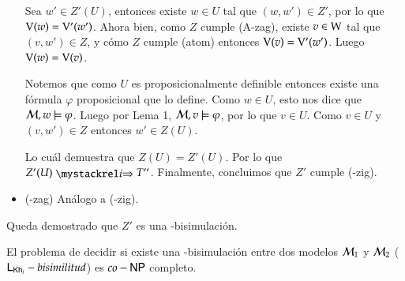 \begin{demostracion}
\begin{itemize}
        Sea $w' \in Z'(U)$, entonces existe $w \in U$ tal que $(w,w') \in Z'$, por lo que $\mathrm{V}(w) = \mathrm{V}'(w')$. Ahora bien, como $Z$ cumple (A-zag), existe $v \in \mathrm{W}$ tal que $(v,w') \in Z$, y cómo $Z$ cumple (atom) entonces $\mathrm{V}(v) = \mathrm{V}'(w')$. Luego $\mathrm{V}(w) = \mathrm{V}(v)$.
    
        Notemos que como $U$ es proposicionalmente definible entonces existe una fórmula $\varphi$ proposicional que lo define. Como $w \in U$, esto nos dice que $\mathcal{M}, w \models \varphi$. Luego por Lema 1, $\mathcal{M}, v \models \varphi$, por lo que $v \in U$. Como $v \in U$ y $(v,w') \in Z$ entonces $w' \in Z(U)$.
    
        Lo cuál demuestra que $Z(U) = Z'(U)$. Por lo que $Z'(U) \ultsExecAgi T''$. Finalmente, concluimos que $Z'$ cumple (\KHilogic-zig).
    
    
        \item (\KHilogic-zag) Análogo a (\KHilogic-zig).
    \end{itemize}
    
    Queda demostrado que $Z'$ es una \KHilogic-bisimulación.
\end{demostracion}


\begin{teorema}
    El problema de decidir si existe una \KHilogic-bisimulación entre dos modelos $\mathcal{M}_1$ y $\mathcal{M}_2$ ($\mathsf{L}_{\mathsf{Kh}_i}-bisimilitud$)  es $co-\rm\textsf{NP}$ completo.
\end{teorema}

